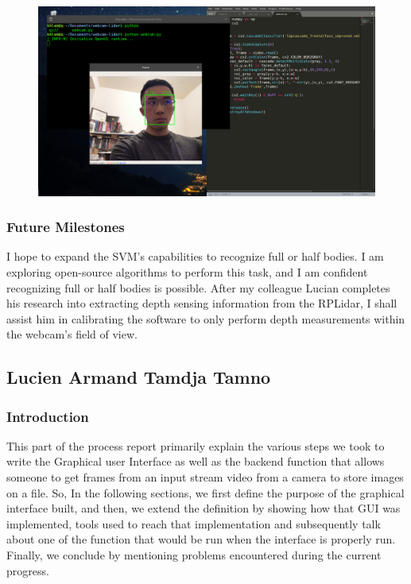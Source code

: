 \documentclass[onecolumn, draftclsnofoot,10pt, compsoc]{IEEEtran}
\begin{document}
\begin{singlespace}
			\begin{figure}[here]
				\includegraphics[scale=0.3]{lam_SVM_progess.png}
				\label{svm}
			\end{figure}

		\subsubsection{Future Milestones}
			I hope to expand the SVM's capabilities to recognize full or half bodies.
			I am exploring open-source algorithms to perform this task, and I am confident recognizing full or half bodies is possible.
			After my colleague Lucian completes his research into extracting depth sensing information from the RPLidar, I shall assist him in calibrating the software to only perform depth measurements within the webcam's field of view.


	\subsection{Lucien Armand Tamdja Tamno}
	
		\subsubsection{Introduction}
			This part of the process report primarily explain the various steps we took  to write the Graphical user Interface as well as the backend function that allows someone to get frames from an input stream video from a camera to store  images on a file. So,  In the following sections, we first define the purpose of the graphical interface built, and then, we extend the definition by showing how that GUI  was implemented, tools used to reach that implementation  and subsequently talk about one of the function that would be run when the interface is properly run. Finally, we conclude by mentioning problems encountered during the current progress. 
		

\end{singlespace}
\end{document}
